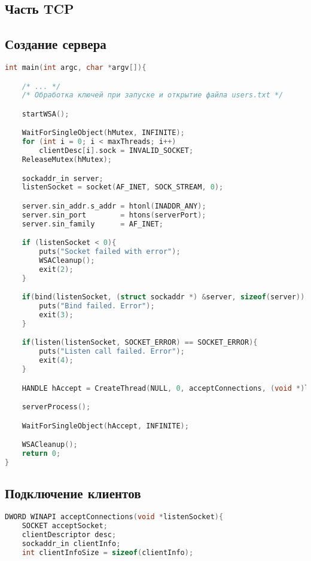 \begin{append}

\section{Часть TCP}
\subsection{Создание сервера} \label{app:createserver}

\begin{lstlisting}[language=C, label=lst:createserver]
int main(int argc, char *argv[]){

    /* ... */
    /* Обработка ключей при запуске и открытие файла users.txt */

    startWSA();

    WaitForSingleObject(hMutex, INFINITE);
    for (int i = 0; i < maxThreads; i++)
        clientDesc[i].sock = INVALID_SOCKET;
    ReleaseMutex(hMutex);

    sockaddr_in server;
    listenSocket = socket(AF_INET, SOCK_STREAM, 0);

    server.sin_addr.s_addr = htonl(INADDR_ANY);
    server.sin_port        = htons(serverPort);
    server.sin_family      = AF_INET;

    if (listenSocket < 0){
        puts("Socket failed with error");
        WSACleanup();
        exit(2);
    }

    if(bind(listenSocket, (struct sockaddr *) &server, sizeof(server)) < 0){
        puts("Bind failed. Error");
        exit(3);
    }

    if(listen(listenSocket, SOCKET_ERROR) == SOCKET_ERROR){
        puts("Listen call failed. Error");
        exit(4);
    }

    HANDLE hAccept = CreateThread(NULL, 0, acceptConnections, (void *)listenSocket, 0, NULL);

    serverProcess();

    WaitForSingleObject(hAccept, INFINITE);

    WSACleanup();
    return 0;
}
\end{lstlisting}

\subsection{Подключение клиентов} \label{app:acceptconnections}

\begin{lstlisting}[language=C, label=lst:createserver]
DWORD WINAPI acceptConnections(void *listenSocket){
    SOCKET acceptSocket;
    clientDescriptor desc;
    sockaddr_in clientInfo;
    int clientInfoSize = sizeof(clientInfo);


\end{lstlisting}
\end{append}
